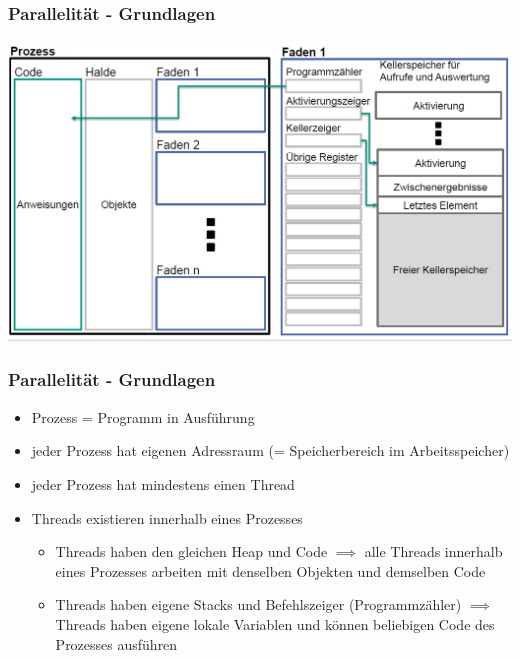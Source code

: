 \documentclass[18pt]{beamer}
\begin{document}
	\begin{frame}
		\frametitle{Parallelität - Grundlagen}
		\includegraphics[scale=0.34]{./pics/tut5/proc-thr.png}
	\end{frame}

	\begin{frame}
		\frametitle{Parallelität - Grundlagen}
		\begin{itemize}
			\item Prozess = Programm in Ausführung \pause
			\item jeder Prozess hat eigenen Adressraum (= Speicherbereich im Arbeitsspeicher) \pause
			\item jeder Prozess hat mindestens einen Thread \pause
			\item Threads existieren innerhalb eines Prozesses \pause 
			\begin{itemize}
				\item Threads haben den gleichen Heap und Code \pause 
					\linebreak $\implies$ alle Threads innerhalb eines Prozesses arbeiten mit denselben Objekten und demselben Code \pause 
				\item Threads haben eigene Stacks und Befehlszeiger (Programmzähler) \pause 
					\linebreak $\implies$ Threads haben eigene lokale Variablen und können beliebigen Code des Prozesses ausführen
			\end{itemize}
		\end{itemize}
	\end{frame}
	
\end{document}
